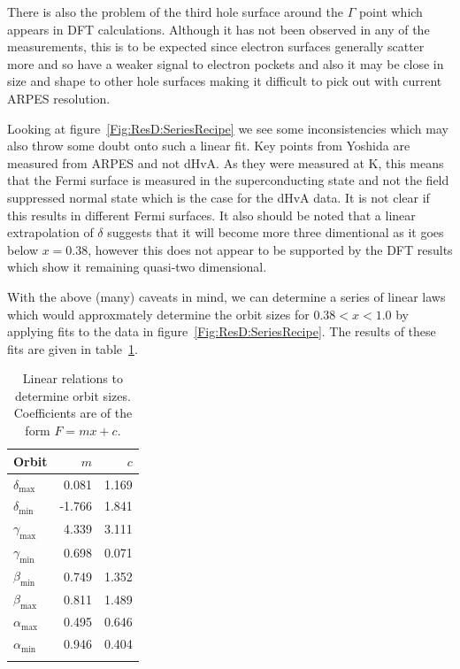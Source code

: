 There is also the problem of the third hole surface around the $\Gamma$ point which appears in \ac{DFT} calculations. Although it has not been observed in any of the measurements, this is to be expected since electron surfaces generally scatter more and so have a weaker signal to electron pockets and also it may be close in size and shape to other hole surfaces making it difficult to pick out with current \ac{ARPES} resolution.

Looking at figure~\ref{Fig:ResD:SeriesRecipe} we see some inconsistencies which may also throw some doubt onto such a linear fit. Key points from Yoshida \etal are measured from \ac{ARPES} and not \ac{dHvA}. As they were measured at \unit[10]{K}, this means that the Fermi surface is measured in the superconducting state and not the field suppressed normal state which is the case for the \ac{dHvA} data. It is not clear if this results in different Fermi surfaces. It also should be noted that a linear extrapolation of $\delta$ suggests that it will become more three dimentional as it goes below $x=0.38$, however this does not appear to be supported by the \ac{DFT} results which show it remaining quasi-two dimensional. 

With the above (many) caveats in mind, we can determine a series of linear laws which would approxmately determine the orbit sizes for $0.38 < x < 1.0$ by applying fits to the data in figure~\ref{Fig:ResD:SeriesRecipe}. The results of these fits are given in table~\ref{Table:ResD:SeriesRecipeFits}.
\begin{table}
    \begin{center}
           \caption{Linear relations to determine orbit sizes. Coefficients are of the form $F=mx+c$.}
        \begin{tabular}[htbp]{lrr}
\toprule
Orbit   & $m$   & $c$   \\
\midrule
$\delta_{\textrm{max}}$ & 0.081 & 1.169 \\
$\delta_{\textrm{min}}$ & -1.766 & 1.841 \\
$\gamma_{\textrm{max}}$ & 4.339 & 3.111 \\
$\gamma_{\textrm{min}}$ & 0.698 &  0.071 \\
$\beta_{\textrm{min}}$ & 0.749 & 1.352 \\
$\beta_{\textrm{max}}$ & 0.811 & 1.489 \\
$\alpha_{\textrm{max}}$ & 0.495 & 0.646 \\
$\alpha_{\textrm{min}}$ & 0.946 & 0.404 \\
\bottomrule
        \label{Table:ResD:SeriesRecipeFits}
        \end{tabular}
    \end{center}
\end{table}

